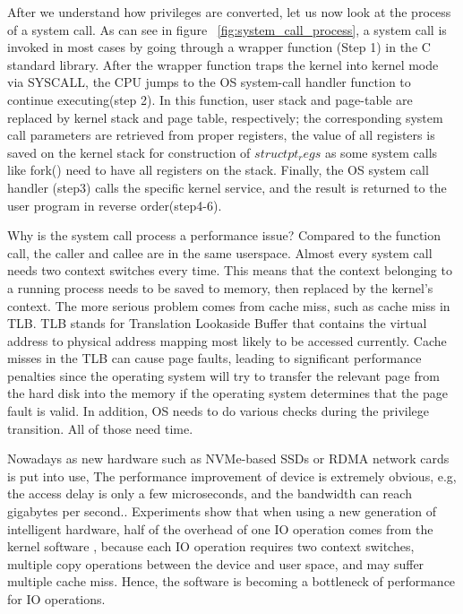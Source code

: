 After we understand how privileges are converted, let us now look at the process of a 
system call. As can see in figure ~\ref{fig:system_call_process}, a system call is invoked in most cases by going 
through a wrapper function (Step 1) in the C standard library. After the wrapper function 
traps the kernel into kernel mode via SYSCALL, the CPU jumps to the OS system-call handler 
function to continue executing(step 2). In this function, user stack and page-table are 
replaced by kernel stack and page table, respectively; the corresponding system call 
parameters are retrieved from proper registers, the value of all registers is saved 
on the kernel stack for construction of $struct pt_regs$ as some system calls like fork() 
need to have all registers on the stack. Finally, the OS system call handler (step3) calls 
the specific kernel service, and the result is returned to the user program in reverse order(step4-6).

Why is the system call process a performance issue? Compared to the function call, 
the caller and callee are in the same userspace. Almost every system call needs two 
context switches every time. 
This means that the context belonging to a running process needs to be saved to 
memory,  then replaced by the kernel's context. The more serious problem comes from 
cache miss, such as cache miss in TLB. TLB stands for Translation Lookaside Buffer 
that contains the virtual address to physical address mapping most likely to be 
accessed currently. Cache misses in the TLB can cause page faults, leading to 
significant performance penalties since the operating system will try to transfer 
the relevant page from the hard disk into the memory if the operating system 
determines that the page fault is valid. In addition, OS needs to do various 
checks during the privilege transition. All of those need time.

Nowadays as new hardware such as NVMe-based SSDs or RDMA network 
cards is put into use, The performance improvement of device is 
extremely obvious, e.g, the access delay is only a few microseconds, 
and the bandwidth can reach gigabytes per second.\cite{Yuhong}. 
Experiments show that when using a new generation of intelligent 
hardware, half of the overhead of one IO operation comes from the 
kernel software \cite{Yuhong}, because each IO operation requires 
two context switches, multiple copy operations between the device 
and user space, and may suffer multiple cache miss. Hence,  
the software is becoming a bottleneck of performance for IO operations.

